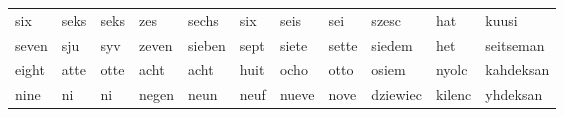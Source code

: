 \documentclass[a4paper, 20pt]{article}
\begin{document}
\begin{table}[h]
{\begin{tabular}{lllllllllll}
six                                                  & seks                                                  & seks                                                 & zes                                                     & sechs                                                & six                                                    & seis                                                   & sei                                                    & szesc                                                & hat                                                   & kuusi                                                \\
seven                                                & sju                                                   & syv                                                  & zeven                                                   & sieben                                               & sept                                                   & siete                                                  & sette                                                  & siedem                                               & het                                                   & seitseman                                            \\
eight                                                & atte                                                  & otte                                                 & acht                                                    & acht                                                 & huit                                                   & ocho                                                   & otto                                                   & osiem                                                & nyolc                                                 & kahdeksan                                            \\
nine                                                 & ni                                                    & ni                                                   & negen                                                   & neun                                                 & neuf                                                   & nueve                                                  & nove                                                   & dziewiec                                             & kilenc                                                & yhdeksan                                             \\

\end{tabular}}
\end{table}
\end{document}
